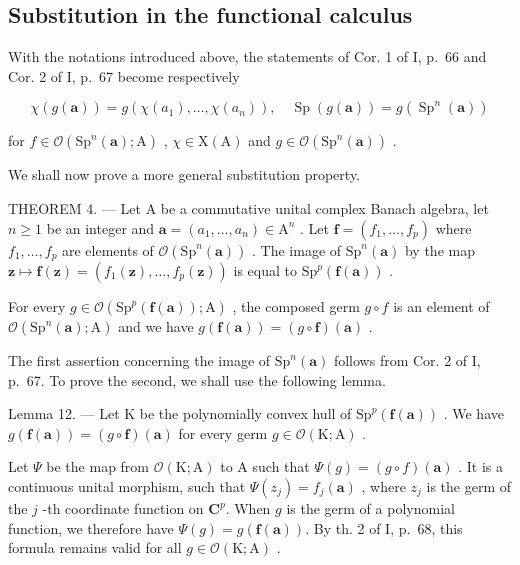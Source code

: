 \subsection{Substitution in the functional calculus}

With the notations introduced above, the statements of Cor. 1 of I, p.~66 and Cor. 2 of I, p.~67 become respectively

\[
\chi (g (\boldsymbol {a})) = g \left(\chi \left(a _ {1}\right), \dots , \chi \left(a _ {n}\right)\right), \quad \operatorname{Sp} (g (\boldsymbol {a})) = g \left(\operatorname{Sp} ^ {n} (\boldsymbol {a})\right)
\]

for \(f \in \mathcal{O}(\mathrm{Sp}^n(\boldsymbol{a});\mathrm{A})\) , \(\chi \in \mathrm{X}(\mathrm{A})\) and \(g \in \mathcal{O}(\mathrm{Sp}^n(\boldsymbol{a}))\) .

We shall now prove a more general substitution property.

THEOREM 4. --- Let A be a commutative unital complex Banach algebra, let \(n \geqslant 1\) be an integer and \(\boldsymbol{a} = (a_1, \ldots, a_n) \in \mathrm{A}^n\) . Let \(\boldsymbol{f} = (f_1, \ldots, f_p)\) where \(f_1, \ldots, f_p\) are elements of \(\mathcal{O}(\mathrm{Sp}^n(\boldsymbol{a}))\) . The image of \(\mathrm{Sp}^n(\boldsymbol{a})\) by the map \(\boldsymbol{z} \mapsto \boldsymbol{f}(\boldsymbol{z}) = (f_1(\boldsymbol{z}), \ldots, f_p(\boldsymbol{z}))\) is equal to \(\mathrm{Sp}^p(\boldsymbol{f}(\boldsymbol{a}))\) .

For every \(g \in \mathcal{O}(\mathrm{Sp}^{p}(\boldsymbol{f}(\boldsymbol{a}));\mathrm{A})\) , the composed germ \(g \circ f\) is an element of \(\mathcal{O}(\mathrm{Sp}^{n}(\boldsymbol{a});\mathrm{A})\) and we have \(g(\boldsymbol{f}(\boldsymbol{a})) = (g \circ \boldsymbol{f})(\boldsymbol{a})\) .

The first assertion concerning the image of \(\mathrm{Sp}^{n}(\boldsymbol{a})\) follows from Cor. 2 of I, p.~67. To prove the second, we shall use the following lemma.

Lemma 12. --- Let K be the polynomially convex hull of \(\mathrm{Sp}^p (\pmb {f}(\pmb {a}))\) . We have \(g(\pmb {f}(\pmb {a})) = (g\circ \pmb {f})(\pmb {a})\) for every germ \(g\in \mathcal{O}(\mathrm{K};\mathrm{A})\) .

Let \(\Psi\) be the map from \(\mathcal{O}(\mathrm{K};\mathrm{A})\) to A such that \(\Psi(g) = (g\circ f)(\boldsymbol{a})\) . It is a continuous unital morphism, such that \(\Psi(z_j) = f_j(\boldsymbol{a})\) , where \(z_{j}\) is the germ of the \(j\) -th coordinate function on \(\mathbf{C}^p\). When \(g\) is the germ of a polynomial function, we therefore have \(\Psi(g) = g(\boldsymbol{f}(\boldsymbol{a}))\). By th. 2 of I, p.~68, this formula remains valid for all \(g\in \mathcal{O}(\mathrm{K};\mathrm{A})\) .

